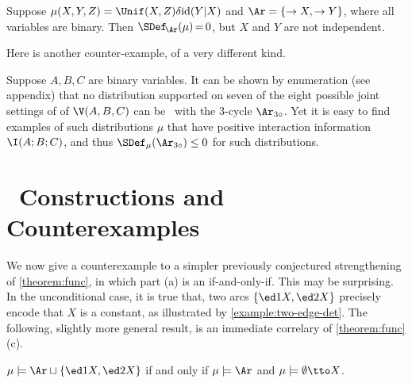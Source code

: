 \begin{subappendices}
\begin{example}
    Suppose $\mu(X,Y,Z) = \Unif(X,Z) \delta \mathrm{id} (Y|X)$ and $\Ar = \{\to X, \to Y\}$,
    where all variables are binary.
    Then $\SDef_{\!\Ar}(\mu) \,{=}\, 0$, but $X$ and $Y$ are not independent.
    \qedhere
\end{example}
Here is another counter-example, of a very different kind.
\begin{example}
    Suppose  $A, B, C$ are binary variables.
    It can be shown by enumeration (see appendix) that
    no distribution supported on seven of the eight
    possible joint settings of of $\V(A,B,C)$ can be
    \scible\ with the 3-cycle $\Ar_{3\circ}$. Yet it is easy
    to find examples of such distributions $\mu$ that have positive
    interaction information $\I(A;B;C)$,
    and thus $\SDef_{\mu}(\Ar_{3\circ}) \le 0$ for such distributions.
\end{example}


\section{\SCibility\ Constructions and Counterexamples}
    \label{sec:func-counterexamples}

We now give a counterexample to a 
simpler previously conjectured strengthening of \cref{theorem:func},
in which part (a) is an if-and-only-if. 
This may be surprising.
In the unconditional case, it is true that, two arcs $\{ \ed1{}X, \ed2{}X \}$ precisely encode that $X$ is a constant, as illustrated by \cref{example:two-edge-det}.
The following, slightly more general result, 
    is an immediate correlary of \cref{theorem:func}(c).

\begin{prop}
    $\mu \models \Ar \sqcup \{ \ed1{}X, \ed2{}X \}$ if and only if $\mu \models \Ar$ and
    $\mu \models \emptyset \tto X$. 
\end{prop}


\end{subappendices}
